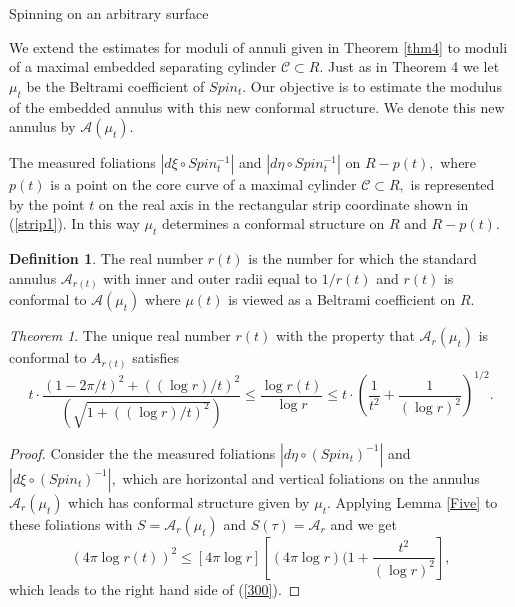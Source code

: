 \documentclass[12pt]{amsart}
\theoremstyle{remark}
\newtheorem{theorem}{Theorem}
\theoremstyle{definition}
\newtheorem{definition}{Definition}
\theoremstyle{definition}
\begin{document}
 
   \begin{section}{Spinning on an arbitrary surface}
   
   
We extend the estimates for moduli of annuli given in Theorem \ref{thm4} to moduli of a maximal embedded separating cylinder ${\mathcal C} \subset R.$   Just as in Theorem 4 we let $\mu_t$ be the Beltrami coefficient of $Spin_t.$ 
 Our objective is to estimate the modulus of the embedded annulus with this new conformal structure.  We denote this new annulus by ${\mathcal A}(\mu_t).$  
 
The measured foliations 
$|d \xi \circ Spin_t^{-1}|$ and $|d \eta \circ Spin_t^{-1}|$ on 
$R-p(t),$  where $p(t)$ is a point on the core curve of a maximal cylinder 
${\mathcal C} \subset R,$ is represented by the point $t$ on the real axis in the rectangular strip
coordinate shown in (\ref{strip1}). In this way $\mu_t$ determines a conformal structure on $R$ and $R-p(t).$ 

 \begin{definition}\label{r(t)} The real number $r(t)$ is the number for which the standard annulus 
 ${\mathcal A}_{r(t)}$ with inner and outer radii equal to  $1/r(t)$ and $r(t)$ is conformal to ${\mathcal A}(\mu_t)$ where $\mu(t)$ is viewed as a Beltrami coefficient on $R.$
 \end{definition}

\begin{theorem}\label{thmsix}  The unique real number $r(t)$ with the property that ${\mathcal A}_r(\mu_t)$ is conformal to $A_{r(t)}$ satisfies 
    \begin{equation}\label{300}
    t \cdot \frac{(1-2\pi/t)^2+ ((\log r)/t)^2}{(\sqrt{1+ ((\log r)/t)^2})} \leq \frac{\log r(t)}{\log r} 
   \leq 
   t \cdot \left(\frac{1}{t^2} + \frac{1}{(\log r)^2}\right)^{1/2}.
   \end{equation}

\end{theorem}
\begin{proof}

Consider the  the
measured foliations 
$|d\eta\circ (Spin_t)^{-1}|$ and $|d\xi \circ (Spin_t)^{-1}|,$ which are horizontal and vertical foliations on the annulus ${\mathcal A}_r(\mu_t)$ which has conformal structure given by $\mu_t.$  Applying Lemma \ref{Five} to these foliations 
with $S={\mathcal A}_r(\mu_t)$ and $S(\tau)={\mathcal A}_r$ and we get
$$(4 \pi \log r(t))^2 \leq 
\left[4 \pi \log r\right]\left[(4 \pi \log r)(1 + \frac{t^2}{(\log r)^2}\right],$$
which leads to the right hand side of (\ref{300}).


\end{proof}
\end{section}
\end{document}
